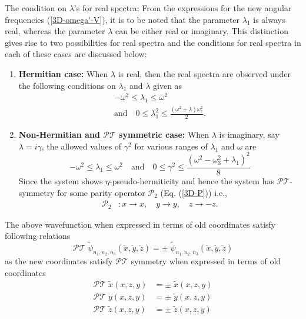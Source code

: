 \documentclass[a4paper, 12pt]{article}
\newcommand{\td}[1]{\tilde{#1}}
\begin{document}
The condition on $\lambda$'s for real spectra: From the expressions for the new angular frequencies (\ref{3D-omega'-V}), it is to be noted that the parameter \(\lambda_1\) is always real, whereas the parameter $\lambda$ can be either real or imaginary. This distinction gives rise to two possibilities for real spectra and the conditions for real spectra in each of these cases are discussed below: 

  \begin{enumerate}
      \item {\bf Hermitian case:} When $\lambda$ is real, then the real spectra are observed under the following conditions on $\lambda_1$ and $\lambda$ given as
      \begin{equation}\label{cond-3D-r-2}
        \begin{split}
            -\omega^2\le\lambda_1\le \omega^2\qquad\qquad\\
           \mbox{and} \quad 0\leq \lambda_1^2\leq \frac{(\omega^2+\lambda)\omega_z^2}{2}.
        \end{split}  
      \end{equation}

      \item {\bf Non-Hermitian and $\mathcal{PT}$ symmetric case:} When $\lambda$ is imaginary, say $\lambda=i \gamma$, the allowed values of $\gamma^2$ for various ranges of $\lambda_1$ and $\omega$ are 
      \begin{equation}\label{cond-3D-i-2}
            -\omega^2\le\lambda_1\le\omega^2 \quad
            \mbox{and}\quad 0\leq \gamma^2\leq \frac{(\omega^2-\omega_3^2+\lambda_1)^2}{8}
        \end{equation}  
      Since the system shows $\eta$-pseudo-hermiticity and hence the system has $\mathcal{PT}$-symmetry for some parity operator $\mathcal{P}_2$ (Eq. (\ref{3D-P})) i.e.,
      \begin{align*}
        \mathcal{P}_2& : x \rightarrow x, \quad y \rightarrow y, \quad z \rightarrow -z.
      \end{align*}
  \end{enumerate}

  The above wavefunction when expressed in terms of old coordinates satisfy following relations 
\[\mathcal{PT}\;\tilde{\psi}_{n_1,n_2,n_3}(\td{x},\td{y},\td{z})=\pm\;\tilde{\psi}_{n_1,n_2,n_3}(\td{x},\td{y},\td{z})\]
as the new coordinates satisfy $\mathcal{PT}$ symmetry when expressed in terms of old coordinates
\begin{align*}
  \mathcal{PT}\;\td{x}(x,z,y)&=\pm\;\td{x}(x,z,y)\\
  \mathcal{PT}\;\td{y}(x,z,y)&=\pm\;\td{y}(x,z,y)\\
  \mathcal{PT}\;\td{z}(x,z,y)&=\pm\;\td{z}(x,z,y)
\end{align*}
\end{document}
